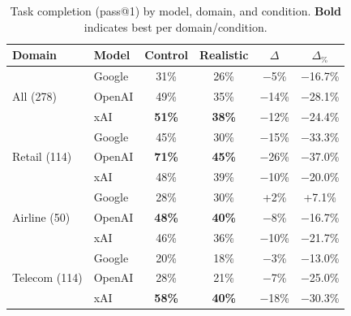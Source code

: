 \begin{table}[h]
\caption{Task completion (pass@1) by model, domain, and condition. \textbf{Bold} indicates best per domain/condition.}
\label{tab:main-results}
\centering
\begin{small}
\begin{tabular}{llcccc}
\toprule
\textbf{Domain} & \textbf{Model} & \textbf{Control} & \textbf{Realistic} & \textbf{$\Delta$} & \textbf{$\Delta_{\%}$} \\
\midrule
\multirow{3}{*}{All (278)} & Google & 31\% & 26\% & $-$5\% & $-$16.7\% \\
 & OpenAI & 49\% & 35\% & $-$14\% & $-$28.1\% \\
 & xAI & \textbf{51\%} & \textbf{38\%} & $-$12\% & $-$24.4\% \\
\midrule
\multirow{3}{*}{Retail (114)} & Google & 45\% & 30\% & $-$15\% & $-$33.3\% \\
 & OpenAI & \textbf{71\%} & \textbf{45\%} & $-$26\% & $-$37.0\% \\
 & xAI & 48\% & 39\% & $-$10\% & $-$20.0\% \\
\midrule
\multirow{3}{*}{Airline (50)} & Google & 28\% & 30\% & +2\% & +7.1\% \\
 & OpenAI & \textbf{48\%} & \textbf{40\%} & $-$8\% & $-$16.7\% \\
 & xAI & 46\% & 36\% & $-$10\% & $-$21.7\% \\
\midrule
\multirow{3}{*}{Telecom (114)} & Google & 20\% & 18\% & $-$3\% & $-$13.0\% \\
 & OpenAI & 28\% & 21\% & $-$7\% & $-$25.0\% \\
 & xAI & \textbf{58\%} & \textbf{40\%} & $-$18\% & $-$30.3\% \\
\bottomrule
\end{tabular}
\end{small}
\end{table}